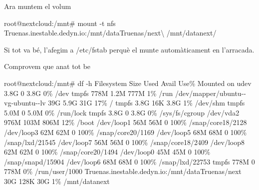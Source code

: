 \documentclass[
  10pt,
]{krantz}
\newenvironment{Shaded}{\begin{snugshade}}{\end{snugshade}}
\newcommand{\AttributeTok}[1]{\textcolor[rgb]{0.77,0.63,0.00}{#1}}
\newcommand{\DataTypeTok}[1]{\textcolor[rgb]{0.13,0.29,0.53}{#1}}
\newcommand{\ExtensionTok}[1]{#1}
\newcommand{\NormalTok}[1]{#1}
\begin{document}
Ara muntem el volum

\begin{Shaded}
\begin{Highlighting}[]
\ExtensionTok{root@nextcloud:/mnt\#}\NormalTok{ mount }\AttributeTok{{-}t}\NormalTok{ nfs Truenas.inestable.dedyn.io:/mnt/dataTruenas/next}\DataTypeTok{\textbackslash{}}
\NormalTok{/mnt/datanext/}
\end{Highlighting}
\end{Shaded}

Si tot va bé, l'afegim a /etc/fstab perquè el munte automàticament en l'arracada.

Comprovem que anat tot be

\begin{Shaded}
\begin{Highlighting}[]
\ExtensionTok{root@nextcloud:/mnt\#}\NormalTok{ df }\AttributeTok{{-}h}
\ExtensionTok{Filesystem}\NormalTok{                             Size  Used Avail Use\% Mounted on}
\ExtensionTok{udev}\NormalTok{                                   3.8G     0  3.8G   0\% /dev}
\ExtensionTok{tmpfs}\NormalTok{                                  778M  1.2M  777M   1\% /run}
\ExtensionTok{/dev/mapper/ubuntu{-}{-}vg{-}ubuntu{-}{-}lv}\NormalTok{       39G  5.9G   31G  17\% /}
\ExtensionTok{tmpfs}\NormalTok{                                  3.8G   16K  3.8G   1\% /dev/shm}
\ExtensionTok{tmpfs}\NormalTok{                                  5.0M     0  5.0M   0\% /run/lock}
\ExtensionTok{tmpfs}\NormalTok{                                  3.8G     0  3.8G   0\% /sys/fs/cgroup}
\ExtensionTok{/dev/vda2}\NormalTok{                              976M  103M  806M  12\% /boot}
\ExtensionTok{/dev/loop1}\NormalTok{                              56M   56M     0 100\% /snap/core18/2128}
\ExtensionTok{/dev/loop3}\NormalTok{                              62M   62M     0 100\% /snap/core20/1169}
\ExtensionTok{/dev/loop5}\NormalTok{                              68M   68M     0 100\% /snap/lxd/21545}
\ExtensionTok{/dev/loop7}\NormalTok{                              56M   56M     0 100\% /snap/core18/2409}
\ExtensionTok{/dev/loop8}\NormalTok{                              62M   62M     0 100\% /snap/core20/1494}
\ExtensionTok{/dev/loop0}\NormalTok{                              45M   45M     0 100\% /snap/snapd/15904}
\ExtensionTok{/dev/loop6}\NormalTok{                              68M   68M     0 100\% /snap/lxd/22753}
\ExtensionTok{tmpfs}\NormalTok{                                  778M     0  778M   0\% /run/user/1000}
\ExtensionTok{Truenas.inestable.dedyn.io:/mnt/dataTruenas/next}\NormalTok{   30G  128K   30G   1\% /mnt/datanext}
\end{Highlighting}
\end{Shaded}
\end{document}
